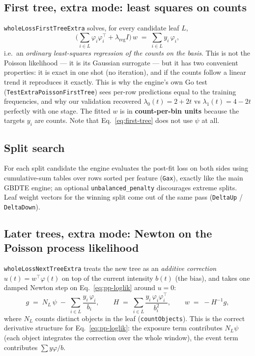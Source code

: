 \documentclass[11pt]{article}
\newcommand{\code}[1]{\texttt{\small #1}}
\begin{document}
\subsection{First tree, extra mode: least squares on counts}

\code{wholeLossFirstTreeExtra} solves, for every candidate leaf $L$,
\begin{equation}
\label{eq:first-tree}
\Big( \sum_{i \in L} \varphi_i \varphi_i^\top + \lambda_{\text{reg}} I \Big)\, w
\;=\; \sum_{i \in L} y_i\, \varphi_i ,
\end{equation}
i.e.\ an \emph{ordinary least-squares regression of the counts on the basis}. This is
not the Poisson likelihood --- it is its Gaussian surrogate --- but it has two convenient
properties: it is exact in one shot (no iteration), and if the counts follow a linear
trend it reproduces it exactly. This is why the engine's own Go test
(\code{TestExtraPoissonFirstTree}) sees per-row predictions equal to the training
frequencies, and why our validation recovered $\lambda_0(t) = 2+2t$ vs
$\lambda_1(t) = 4-2t$ perfectly with one stage. The fitted $w$ is in
\textbf{count-per-bin units} because the targets $y_i$ are counts. Note that
Eq.~\eqref{eq:first-tree} does not use $\psi$ at all.

\subsection{Split search}

For each split candidate the engine evaluates the post-fit loss on both sides using
cumulative-sum tables over rows sorted per feature (\code{Gax}), exactly like the main
GBDTE engine; an optional \code{unbalanced\_penalty} discourages extreme splits. Leaf
weight vectors for the winning split come out of the same pass (\code{DeltaUp} /
\code{DeltaDown}).

\subsection{Later trees, extra mode: Newton on the Poisson process likelihood}

\code{wholeLossNextTreeExtra} treats the new tree as an \emph{additive correction}
$u(t) = w^\top\varphi(t)$ on top of the current intensity $b(t)$ (the bias), and takes
one damped Newton step on Eq.~\eqref{eq:pp-loglik} around $u = 0$:
\begin{equation}
\label{eq:newton}
g \;=\; N_L\, \psi \;-\; \sum_{i \in L} \frac{y_i\, \varphi_i}{b_i},
\qquad
H \;=\; \sum_{i \in L} \frac{y_i\, \varphi_i \varphi_i^\top}{b_i^2},
\qquad
w \;=\; -H^{-1} g,
\end{equation}
where $N_L$ counts distinct objects in the leaf (\code{countObjects}). This is the
correct derivative structure for Eq.~\eqref{eq:pp-loglik}: the exposure term
contributes $N_L \psi$ (each object integrates the correction over the whole window),
the event term contributes $\sum y\varphi/b$.
\end{document}
